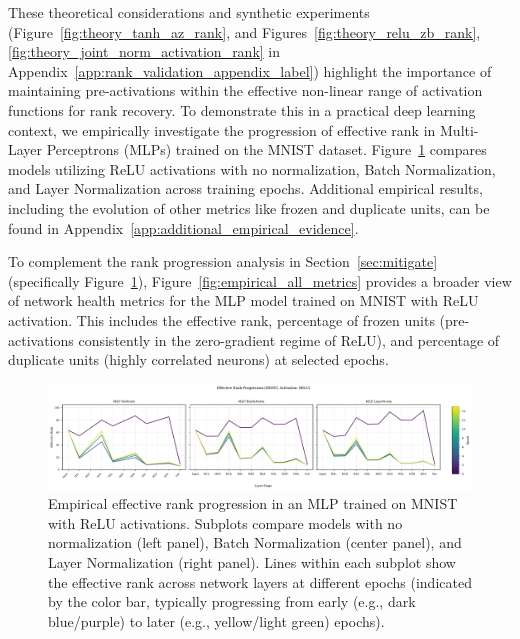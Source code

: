 \documentclass{article}
\begin{document}

These theoretical considerations and synthetic experiments (Figure~\ref{fig:theory_tanh_az_rank}, and Figures~\ref{fig:theory_relu_zb_rank}, \ref{fig:theory_joint_norm_activation_rank} in Appendix~\ref{app:rank_validation_appendix_label}) highlight the importance of maintaining pre-activations within the effective non-linear range of activation functions for rank recovery. 
To demonstrate this in a practical deep learning context, we empirically investigate the progression of effective rank in Multi-Layer Perceptrons (MLPs) trained on the MNIST dataset. Figure~\ref{fig:empirical_rank_progression} compares models utilizing ReLU activations with no normalization, Batch Normalization, and Layer Normalization across training epochs. Additional empirical results, including the evolution of other metrics like frozen and duplicate units, can be found in Appendix~\ref{app:additional_empirical_evidence}.

To complement the rank progression analysis in Section~\ref{sec:mitigate} (specifically Figure~\ref{fig:empirical_rank_progression}), Figure~\ref{fig:empirical_all_metrics} provides a broader view of network health metrics for the MLP model trained on MNIST with ReLU activation. This includes the effective rank, percentage of frozen units (pre-activations consistently in the zero-gradient regime of ReLU), and percentage of duplicate units (highly correlated neurons) at selected epochs.


\begin{figure}[ht!]
    \centering
    \includegraphics[width=\textwidth]{figures/empirical_rank_progression_relu_mnist.pdf} 
    \caption{Empirical effective rank progression in an MLP trained on MNIST with ReLU activations. Subplots compare models with no normalization (left panel), Batch Normalization (center panel), and Layer Normalization (right panel). Lines within each subplot show the effective rank across network layers at different epochs (indicated by the color bar, typically progressing from early (e.g., dark blue/purple) to later (e.g., yellow/light green) epochs).}
    \label{fig:empirical_rank_progression}
\end{figure}
\end{document}
